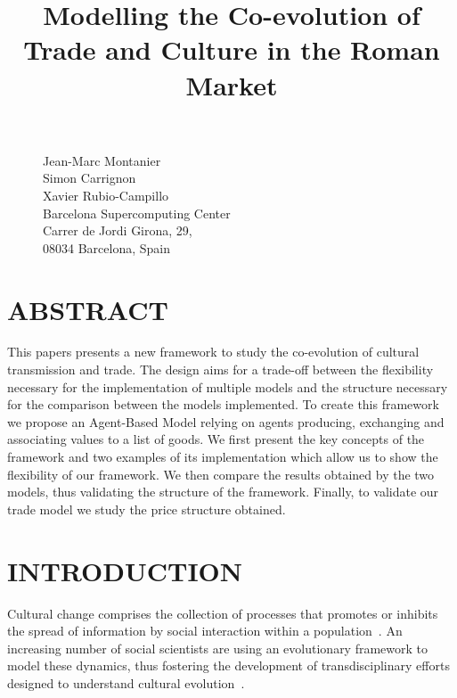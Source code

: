 \documentclass{wscpaperproc}
\begin{document}

\title{Modelling the Co-evolution of Trade and Culture in the Roman Market}

\maketitle

\begin{figure}[htb]
{
\centering
Jean-Marc Montanier\\
Simon Carrignon\\ 
Xavier Rubio-Campillo\\
\vspace{12pt}
Barcelona Supercomputing Center\\
Carrer de Jordi Girona, 29, \\
08034 Barcelona, Spain\\
}
\end{figure}


\section*{ABSTRACT}

This papers presents a new framework to study the co-evolution of cultural transmission and trade. The design aims for a trade-off between the flexibility necessary for the implementation of multiple models and the structure necessary for the comparison between the models implemented. To create this framework we propose an Agent-Based Model relying on agents producing, exchanging and associating values to a list of goods. We first present the key concepts of the framework and two examples of its implementation which allow us to show the flexibility of our framework. We then compare the results obtained by the two models, thus validating the structure of the framework. Finally, to validate our trade model we study the price structure obtained.


\section{INTRODUCTION}\label{sec:intro}


Cultural change comprises the collection of processes that promotes or inhibits the spread of information by social interaction within a population~\cite{boyd_origin_2005}. An increasing number of social scientists are using an evolutionary framework to model these dynamics, thus fostering the development of transdisciplinary efforts designed to understand cultural evolution~\cite{henrich_evolution_2003}.
\end{document}

